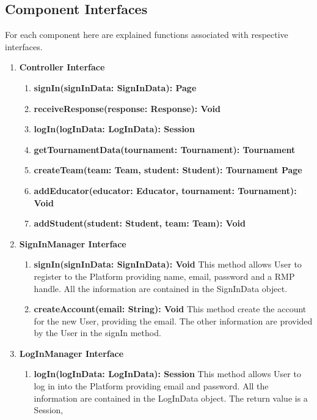 \subsection{Component Interfaces}
For each component here are explained functions associated with respective interfaces.
\begin{enumerate}
    \item \textbf{Controller Interface}
            \begin{enumerate}[label=$\bullet$]
                \item \textbf{signIn(signInData: SignInData): Page}
                \item \textbf{receiveResponse(response: Response): Void}
                \item \textbf{logIn(logInData: LogInData): Session}
                \item \textbf{getTournamentData(tournament: Tournament): Tournament}
                \item \textbf{createTeam(team: Team, student: Student): Tournament Page}
                \item \textbf{addEducator(educator: Educator, tournament: Tournament): Void}
                \item \textbf{addStudent(student: Student, team: Team): Void}
            \end{enumerate}
    \item \textbf{SignInManager Interface} 
            \begin{enumerate}[label=$\bullet$]
                \item \textbf{signIn(signInData: SignInData): Void} This method allows User to register to the Platform providing name, email, password and a RMP handle. All the information are contained in the SignInData object.
                \item \textbf{createAccount(email: String): Void} This method create the account for the new User, providing the email. The other information are provided by the User in the signIn method.
            \end{enumerate}
    \item \textbf{LogInManager Interface}
        \begin{enumerate}[label=$\bullet$]
            \item \textbf{logIn(logInData: LogInData): Session} This method allows User to log in into the Platform providing email and password. All the information are contained in the LogInData object. The return value is a Session,

\end{enumerate}
\end{enumerate}
